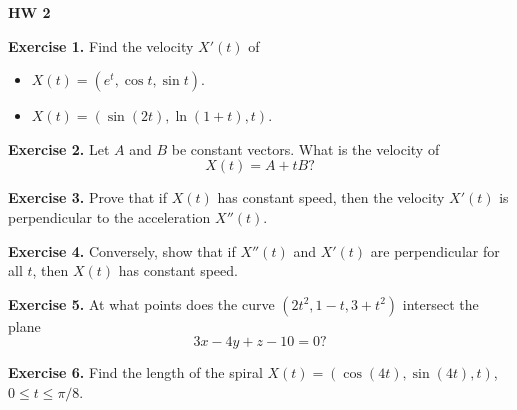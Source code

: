 \documentclass{article}
\begin{document}

\textbf{HW 2}

\textbf{Exercise 1.} Find the velocity $X'(t)$ of
\begin{itemize}
    \item $X(t) = (e^t,\cos t, \sin t)$.
    \item $X(t) = (\sin(2t), \ln(1+t), t)$.
\end{itemize}

\textbf{Exercise 2.} Let $A$ and $B$ be constant vectors. What is the velocity of
\[X(t) = A + tB?\]

\textbf{Exercise 3.} Prove that if $X(t)$ has constant speed, then the velocity $X'(t)$ 
is perpendicular to the acceleration $X''(t)$.

\textbf{Exercise 4.} Conversely, show that if $X''(t)$ and $X'(t)$ are perpendicular for all $t$, then
$X(t)$ has constant speed.

\textbf{Exercise 5.} At what points does the curve
$(2t^2, 1-t, 3+t^2)$ intersect the plane
\[3x-4y+z-10=0?\]

\textbf{Exercise 6.} Find the length of the spiral
$X(t) = (\cos(4t), \sin(4t), t)$, $0 \leq t \leq \pi/8$.
\end{document}
